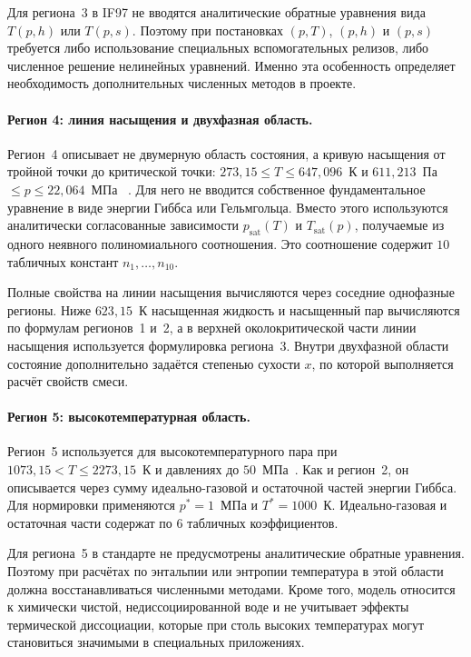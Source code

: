 	Для региона~3 в IF97 не вводятся аналитические обратные уравнения
		вида $T(p, h)$ или $T(p, s)$.
Поэтому при постановках $(p, T)$, $(p, h)$ и $(p, s)$
требуется либо использование специальных вспомогательных релизов,
либо численное решение нелинейных уравнений.
Именно эта особенность определяет необходимость
дополнительных численных методов в проекте.

\paragraph*{Регион 4: линия насыщения и двухфазная область.}
Регион~4 описывает не двумерную область состояния,
	а кривую насыщения от тройной точки до критической точки:
	$273{,}15 \le T \le 647{,}096$~К
	и $611{,}213$~Па $\le p \le 22{,}064$~МПа
	~\cite{iapws_if97_2012}.
Для него не вводится собственное фундаментальное уравнение
в виде энергии Гиббса или Гельмгольца.
Вместо этого используются аналитически согласованные зависимости
$p_{\mathrm{sat}}(T)$ и $T_{\mathrm{sat}}(p)$,
получаемые из одного неявного полиномиального соотношения.
Это соотношение содержит $10$ табличных констант
$n_1,\dots,n_{10}$.

	Полные свойства на линии насыщения
	вычисляются через соседние однофазные регионы.
	Ниже $623{,}15$~К насыщенная жидкость
	и насыщенный пар вычисляются по формулам регионов~1 и~2,
	а в верхней околокритической части линии насыщения
	используется формулировка региона~3.
Внутри двухфазной области состояние дополнительно задаётся
степенью сухости $x$,
по которой выполняется расчёт свойств смеси.

\paragraph*{Регион 5: высокотемпературная область.}
Регион~5 используется для высокотемпературного пара
	при $1073{,}15 < T \le 2273{,}15$~К
	и давлениях до $50$~МПа~\cite{iapws_if97_2012}.
	Как и регион~2,
	он описывается через сумму идеально-газовой
	и остаточной частей энергии Гиббса.
	Для нормировки применяются
	$p^{*}=1$~МПа и $T^{*}=1000$~К.
Идеально-газовая и остаточная части
содержат по $6$ табличных коэффициентов.

	Для региона~5 в стандарте не предусмотрены
	аналитические обратные уравнения.
Поэтому при расчётах по энтальпии или энтропии
температура в этой области
должна восстанавливаться численными методами.
Кроме того, модель относится к химически чистой,
недиссоциированной воде
и не учитывает эффекты термической диссоциации,
которые при столь высоких температурах
могут становиться значимыми в специальных приложениях.
